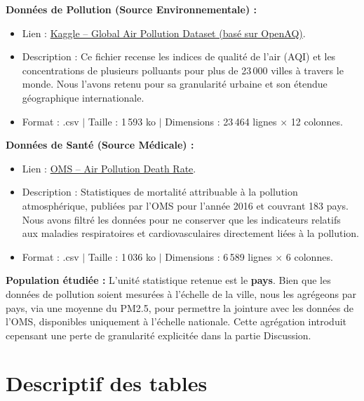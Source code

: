 \documentclass[mstat,12pt]{unswthesis}
\begin{document}
\bigskip

\textbf{Données de Pollution (Source Environnementale) :}

\begin{itemize}
  \item Lien : \href{https://www.kaggle.com/datasets/hasibalmuzdadid/global-air-pollution-dataset/data}{Kaggle -- Global Air Pollution Dataset (basé sur OpenAQ)}.
  \item Description : Ce fichier recense les indices de qualité de l'air (AQI) et les concentrations de plusieurs polluants pour plus de 23\,000 villes à travers le monde. Nous l'avons retenu pour sa granularité urbaine et son étendue géographique internationale.
  \item Format : .csv $|$ Taille : 1\,593 ko $|$ Dimensions : 23\,464 lignes $\times$ 12 colonnes.
\end{itemize}

\bigskip

\textbf{Données de Santé (Source Médicale) :}

\begin{itemize}
  \item Lien : \href{https://www.kaggle.com/datasets/utkarshxy/who-worldhealth-statistics-2020-complete?select=airPollutionDeathRate.csv}{OMS -- Air Pollution Death Rate}.
  \item Description : Statistiques de mortalité attribuable à la pollution atmosphérique, publiées par l'OMS pour l'année 2016 et couvrant 183 pays. Nous avons filtré les données pour ne conserver que les indicateurs relatifs aux maladies respiratoires et cardiovasculaires directement liées à la pollution.
  \item Format : .csv $|$ Taille : 1\,036 ko $|$ Dimensions : 6\,589 lignes $\times$ 6 colonnes.
\end{itemize}

\bigskip

\textbf{Population étudiée :} L'unité statistique retenue est le
\textbf{pays}. Bien que les données de pollution soient mesurées à
l'échelle de la ville, nous les agrégeons par pays, via une moyenne du
PM2.5, pour permettre la jointure avec les données de l'OMS, disponibles
uniquement à l'échelle nationale. Cette agrégation introduit cepensant
une perte de granularité explicitée dans la partie Discussion.

\section{Descriptif des tables}\label{descriptif-des-tables}
\end{document}
